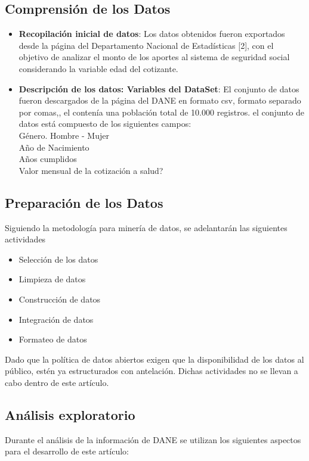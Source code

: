   \subsection{Comprensión de los Datos}
 
   \begin{itemize}
   \item \textbf{Recopilación inicial de datos}: Los datos obtenidos fueron exportados desde la página del Departamento Nacional de Estadísticas [2],  con el objetivo de analizar el monto de los aportes al sistema de seguridad social considerando la variable edad del cotizante.\\
   
   \item \textbf{Descripción de los datos: Variables del DataSet}: El conjunto de datos fueron descargados de la página del DANE en formato csv, formato separado por comas,, el contenía una población total de 10.000 registros.  el conjunto de datos está compuesto de los siguientes campos: 
   \\ 	 
   Género. Hombre - Mujer\\
   Año de Nacimiento\\
   Años cumplidos\\ 
   Valor mensual de la cotización a salud?\\
     
\end{itemize} 
  	
	
  \subsection{Preparación de los Datos}
  Siguiendo la metodología para minería de datos, se adelantarán las siguientes actividades 
  \begin{itemize}
  	\item Selección de los datos
  	\item Limpieza de datos
	\item Construcción de datos
    \item Integración de datos
	\item Formateo de datos
   \end{itemize}  
   Dado que la política de datos abiertos exigen que la disponibilidad de los datos al público, estén ya estructurados con antelación.  Dichas actividades no se llevan a cabo dentro de este artículo.

  \subsection{Análisis exploratorio}
Durante el análisis de la información de DANE se utilizan los siguientes aspectos para el desarrollo de este artículo:


